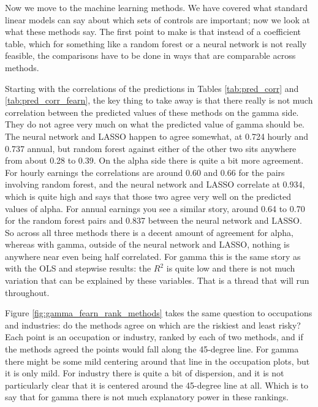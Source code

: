 \documentclass[12pt]{article}
\begin{document}
\begin{onehalfspace}
Now we move to the machine learning methods. We have covered what standard linear models can say about which sets of controls are important; now we look at what these methods say. The first point to make is that instead of a coefficient table, which for something like a random forest or a neural network is not really feasible, the comparisons have to be done in ways that are comparable across methods.

Starting with the correlations of the predictions in Tables \ref{tab:pred_corr} and \ref{tab:pred_corr_fearn}, the key thing to take away is that there really is not much correlation between the predicted values of these methods on the gamma side. They do not agree very much on what the predicted value of gamma should be. The neural network and LASSO happen to agree somewhat, at 0.724 hourly and 0.737 annual, but random forest against either of the other two sits anywhere from about 0.28 to 0.39. On the alpha side there is quite a bit more agreement. For hourly earnings the correlations are around 0.60 and 0.66 for the pairs involving random forest, and the neural network and LASSO correlate at 0.934, which is quite high and says that those two agree very well on the predicted values of alpha. For annual earnings you see a similar story, around 0.64 to 0.70 for the random forest pairs and 0.837 between the neural network and LASSO. So across all three methods there is a decent amount of agreement for alpha, whereas with gamma, outside of the neural network and LASSO, nothing is anywhere near even being half correlated. For gamma this is the same story as with the OLS and stepwise results: the $R^2$ is quite low and there is not much variation that can be explained by these variables. That is a thread that will run throughout.

\begin{table}[H]
    \centering
    \caption{Correlation of ML Predictions, Hourly Earnings}
    \label{tab:pred_corr}
    
\end{table}

\begin{table}[H]
    \centering
    \caption{Correlation of ML Predictions, Annual Earnings}
    \label{tab:pred_corr_fearn}
    
\end{table}


Figure \ref{fig:gamma_fearn_rank_methods} takes the same question to occupations and industries: do the methods agree on which are the riskiest and least risky? Each point is an occupation or industry, ranked by each of two methods, and if the methods agreed the points would fall along the 45-degree line. For gamma there might be some mild centering around that line in the occupation plots, but it is only mild. For industry there is quite a bit of dispersion, and it is not particularly clear that it is centered around the 45-degree line at all. Which is to say that for gamma there is not much explanatory power in these rankings.


\end{onehalfspace}
\end{document}
